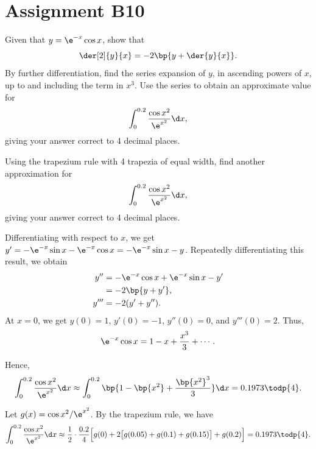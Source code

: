 \section{Assignment B10}

\begin{problem}
    Given that $y = \e^{-x}\cos x$, show that \[\der[2]{y}{x} = -2\bp{y + \der{y}{x}}.\] By further differentiation, find the series expansion of $y$, in ascending powers of $x$, up to and including the term in $x^3$. Use the series to obtain an approximate value for \[\int_0^{0.2} \frac{\cos x^2}{\e^{x^2}} \d x,\] giving your answer correct to 4 decimal places.

    Using the trapezium rule with 4 trapezia of equal width, find another approximation for \[\int_0^{0.2}\frac{\cos x^2}{\e^{x^2}} \d x,\] giving your answer correct to 4 decimal places.
\end{problem}
\begin{solution}
    Differentiating with respect to $x$, we get $y' = -\e^{-x}\sin x - \e^{-x} \cos x = -\e^{-x} \sin x - y$. Repeatedly differentiating this result, we obtain
    \begin{align*}
        y'' &= -\e^{-x} \cos x + \e^{-x} \sin x - y'\\
        &= -2\bp{y + y'},\\
        y''' &= -2(y' + y'').
    \end{align*}
    At $x = 0$, we get $y(0) = 1$, $y'(0) = -1$, $y''(0) = 0$, and $y'''(0) = 2$. Thus, \[\e^{-x}\cos x = 1 - x + \frac{x^3}3 + \cdots.\]

    Hence, \[\int_0^{0.2} \frac{\cos x^2}{\e^{x^2}} \d x \approx \int_0^{0.2} \bp{1 - \bp{x^2} + \frac{\bp{x^2}^3}3} \d x = 0.1973 \todp{4}.\]

    Let $g(x) = \cos{x^2}/\e^{x^2}$. By the trapezium rule, we have \[\int_0^{0.2} \frac{\cos x^2}{\e^{x^2}} \d x \approx \frac12 \cdot \frac{0.2}{4} \Big[g(0) + 2\big[g(0.05) + g(0.1) + g(0.15)\big] + g(0.2)\Big] = 0.1973 \todp{4}.\]
\end{solution}

